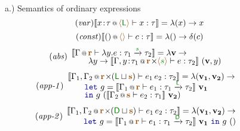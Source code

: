 \begin{figure}[t]
{\small a.) Semantics of ordinary expressions}
\begin{equation*}
\tag{\emph{var}}
\sem{\coctx{x \!:\! \tau}{\alift{\cclrd{\ident L}}} \vdash x : \tau} = \lambda(x) \rightarrow x
\end{equation*}
\vspace{-1.5em}
\begin{equation*}
\tag{\emph{const}}
\sem{\coctx{()}{\alift{}} \vdash c : \tau} = \lambda () \rightarrow \delta(c)
\end{equation*}
\vspace{-1.5em}
\begin{equation*}
\hspace{-0.5em}
\tag{\emph{abs}}
\begin{array}{l}
\sem{\coctx{\Gamma}{\aclrd{\textbf{r}}} \vdash \lambda y . e : \tau_1 \xrightarrow{\cclrd{s}} \tau_2} = \lambda \textbf{v} \rightarrow\\[-0.25em]
\qquad\lambda y \rightarrow \sem{\coctx{\Gamma, y \!:\! \tau_1}{\aclrd{\textbf{r}} \cons \alift{\cclrd{s}}} \vdash e : \tau_2}~(\textbf{v}, y)
\end{array}
\end{equation*}
\vspace{-1.0em}
\begin{equation*}
\hspace{-0.5em}
\tag{\emph{app-1}}
\begin{array}{l}
\sem{ \coctx{\Gamma_1, \Gamma_2}{\aclrd{\textbf{r}} \cons (\cclrd{\ident{L}} \sqcup \aclrd{\textbf{s}})} \vdash e_1 \, e_2 : \tau_2} = 
  \lambda (\mathbf{v_1}, \mathbf{v_2}) \rightarrow \\[-0.25em]
  \qquad\kvd{let}~g = \sem{ \coctx{\Gamma_1}{\aclrd{\textbf{r}}} \vdash e_1 : \tau_1 \xrightarrow{\cclrd{\ident{L}}} \tau_2 }~\mathbf{v_1}\\[-0.25em]
  \qquad\kvd{in}~g~(\sem{ \coctx{\Gamma_2}{\aclrd{\textbf{s}}} \vdash e_2 : \tau_1 }~\mathbf{v_2})
\end{array}
\end{equation*}
\vspace{-1.0em}
\begin{equation*}
\hspace{-0.5em}
\tag{\emph{app-2}}
\begin{array}{l}
\sem{ \coctx{\Gamma_1, \Gamma_2}{\aclrd{\textbf{r}} \cons (\cclrd{\ident{D}} \sqcup \aclrd{\textbf{s}})} \vdash e_1 \, e_2 : \tau_2} = 
  \lambda (\mathbf{v_1}, \mathbf{v_2}) \rightarrow \\[-0.25em]
  \qquad\kvd{let}~g = \sem{ \coctx{\Gamma_1}{\aclrd{\textbf{r}}} \vdash e_1 : \tau_1 \xrightarrow{\cclrd{\ident{D}}} \tau_2 }~\mathbf{v_1}~
  \kvd{in}~g~()
\end{array}
\end{equation*}
\vspace{0.5em}


\end{figure}
